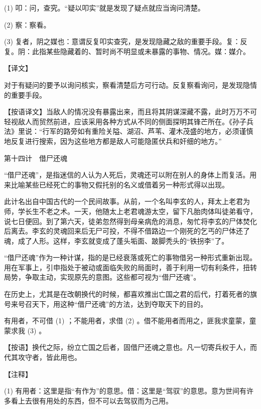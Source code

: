 \documentclass[12pt,UTF8]{ctexbook}
\begin{document}
(1) 叩：问，查究。“疑以叩实”就是发现了疑点就应当询问清楚。

(2) 察：察看。

(3) 复者，阴之媒也：意谓反复叩实查究，是发现隐藏之敌的重要手段。复：反复。阴：此指某些隐藏着的、暂时尚不明显或未暴露的事物、情况。媒：媒介。





【译文】


对于有疑问的要予以询问核实，察看清楚后方可行动。反复察看询问，是发现隐情的重要手段。

【按语译文】当敌人的情况没有暴露出来，而且将其阴谋深藏不露，此时万万不可轻视敌人而贸然前进，应该采用各种方式从不同的侧面探明其锋芒所在。《孙子兵法》里说：“行军的路旁如有重险关隘、湖沼、芦苇、灌木茂盛的地方，必须谨慎地反复进行搜索，因为这些地方都是敌人可能隐匿伏兵和奸细的地方。”





第十四计　借尸还魂


“借尸还魂”，是指迷信的人认为人死后，灵魂还可以附在别人的身体上而复活。用来比喻某些已经死亡的事物又假托别的名义或借着另一种形式得以出现。

此计名出自中国古代的一个民间故事。从前，一个名叫李玄的人，拜太上老君为师，学长生不老之术。一天，他随太上老君魂游太空，留下凡胎肉体叫徒弟看守，说七日便回。到了第六天，徒弟忽然得到母亲病危的消息，匆忙将李玄的尸体焚化后离去。李玄的灵魂回来后无尸可投，不得不借路边一个刚死的乞丐的尸体还了魂，成了人形。这样，李玄就变成了蓬头垢面、跛脚秃头的“铁拐李”了。

“借尸还魂”作为一种计谋，指的是已经衰落或死亡的事物借另一种形式重新出现。用在军事上，引申指处于被动或面临失败的局面时，善于利用一切有利条件，扭转局势，争取主动，实现原先的意图。这些都可视为“借尸还魂”。

在历史上，尤其是在改朝换代的时候，都喜欢推出亡国之君的后代，打着死者的旗号来号召天下，用这种“借尸还魂”的方法，达到夺取天下的目的。





有用者，不可借 (1) ；不能用者，求借 (2) 。借不能用者而用之，匪我求童蒙，童蒙求我 (3) 。

【按语】换代之际，纷立亡国之后者，固借尸还魂之意也。凡一切寄兵权于人，而代其攻守者，皆此用也。





【注释】


(1) 有用者：这里是指“有作为”的意思。借：这里是“驾驭”的意思。意为世间有许多看上去很有用处的东西，但不可以去驾驭而为己用。
\end{document}
